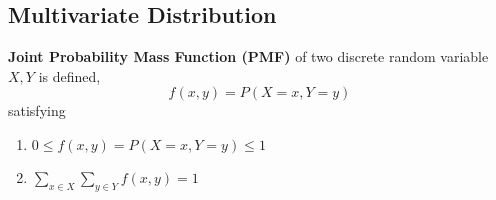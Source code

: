 \documentclass[11pt]{article}
\begin{document}
\subsection*{Multivariate Distribution}

$ $\\
\textbf{Joint Probability Mass Function (PMF)} of two discrete random variable $X,Y$ is defined,
\[
  f(x,y) = P(X=x, Y=y)
\]
satisfying
\begin{enumerate}
  \item $0\leq f(x,y) = P(X=x, Y=y)\leq 1$
  \item $\sum_{x\in X} \sum_{y\in Y} f(x,y) = 1$
\end{enumerate}
\end{document}
